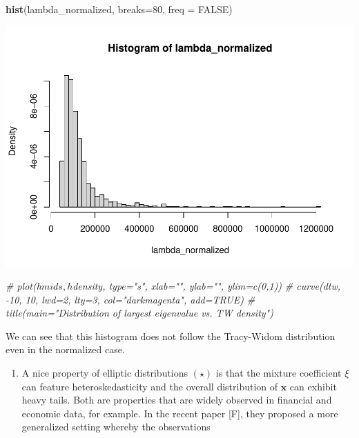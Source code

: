 \documentclass[
]{article}
\newenvironment{Shaded}{\begin{snugshade}}{\end{snugshade}}
\newcommand{\AttributeTok}[1]{\textcolor[rgb]{0.13,0.29,0.53}{#1}}
\newcommand{\CommentTok}[1]{\textcolor[rgb]{0.56,0.35,0.01}{\textit{#1}}}
\newcommand{\ConstantTok}[1]{\textcolor[rgb]{0.56,0.35,0.01}{#1}}
\newcommand{\DecValTok}[1]{\textcolor[rgb]{0.00,0.00,0.81}{#1}}
\newcommand{\FunctionTok}[1]{\textcolor[rgb]{0.13,0.29,0.53}{\textbf{#1}}}
\newcommand{\NormalTok}[1]{#1}
\providecommand{\tightlist}{%
  \setlength{\itemsep}{0pt}\setlength{\parskip}{0pt}}
\begin{document}
\begin{Shaded}
\begin{Highlighting}[]
\FunctionTok{hist}\NormalTok{(lambda\_normalized, }\AttributeTok{breaks=}\DecValTok{80}\NormalTok{, }\AttributeTok{freq =} \ConstantTok{FALSE}\NormalTok{)}
\end{Highlighting}
\end{Shaded}

\includegraphics{A5_files/figure-latex/unnamed-chunk-26-1.pdf}

\begin{Shaded}
\begin{Highlighting}[]
\CommentTok{\# plot(h$mids, h$density, type="s", xlab="", ylab="", ylim=c(0,1))}
\CommentTok{\# curve(dtw, {-}10, 10, lwd=2, lty=3, col="darkmagenta", add=TRUE)}
\CommentTok{\# title(main="Distribution of largest eigenvalue vs. TW density")}
\end{Highlighting}
\end{Shaded}

We can see that this histogram does not follow the Tracy-Widom
distribution even in the normalized case.

\begin{enumerate}
\def\labelenumi{(\alph{enumi})}
\setcounter{enumi}{3}
\tightlist
\item
  A nice property of elliptic distributions \((\star)\) is that the
  mixture coefficient \(\xi\) can feature heteroskedasticity and the
  overall distribution of \(\mathbf{x}\) can exhibit heavy tails. Both
  are properties that are widely observed in financial and economic
  data, for example. In the recent paper {[}F{]}, they proposed a more
  generalized setting whereby the observations
\end{enumerate}
\end{document}
